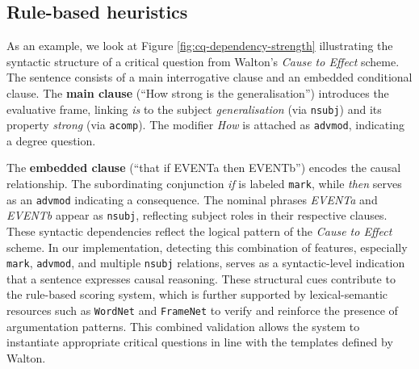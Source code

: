\documentclass[11pt]{article}
\begin{document}
\subsection{Rule-based heuristics}

\noindent
As an example, we look at Figure \ref{fig:cq-dependency-strength} illustrating the syntactic structure of a critical question from Walton’s \textit{Cause to Effect} scheme. The sentence consists of a main interrogative clause and an embedded conditional clause. 
The \textbf{main clause} (“How strong is the generalisation”)
introduces the evaluative frame, linking \textit{is} to the subject \textit{generalisation} (via \texttt{nsubj}) and its property \textit{strong} (via \texttt{acomp}). The modifier \textit{How} is attached as \texttt{advmod}, indicating a degree question.

The \textbf{embedded clause} (“that if EVENTa then EVENTb”) encodes the causal relationship. The subordinating conjunction \textit{if} is labeled \texttt{mark}, while \textit{then} serves as an \texttt{advmod} indicating a consequence. The nominal phrases \textit{EVENTa} and \textit{EVENTb} appear as \texttt{nsubj}, reflecting subject roles in their respective clauses. These syntactic dependencies reflect the logical pattern of the \textit{Cause to Effect} scheme. 
In our implementation, detecting this combination of features, especially \texttt{mark}, \texttt{advmod}, and multiple \texttt{nsubj} relations, serves as a syntactic-level indication that a sentence expresses causal reasoning. These structural cues contribute to the rule-based scoring system, which is further supported by lexical-semantic resources such as \texttt{WordNet} and  \texttt{FrameNet} to verify and reinforce the presence of argumentation patterns. This combined validation allows the system to instantiate appropriate critical questions in line with the templates defined by Walton.
\end{document}
